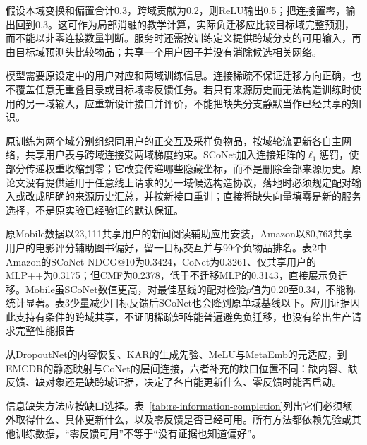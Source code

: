 假设本域变换和偏置合计0.3，跨域贡献为0.2，则ReLU输出0.5；把连接置零，输出回到0.3。这可作为局部消融的教学计算，实际负迁移应比较目标域完整预测，而不能以非零连接数量判断。服务时还需按训练定义提供跨域分支的可用输入，再由目标域预测头比较物品；共享一个用户因子并没有消除候选相关网络。

模型需要原设定中的用户对应和两域训练信息。连接稀疏不保证迁移方向正确，也不覆盖任意无重叠目录或目标域零反馈任务。若只有来源历史而无法构造训练时使用的另一域输入，应重新设计接口并评价，不能把缺失分支静默当作已经共享的知识。

原训练为两个域分别组织同用户的正交互及采样负物品，按域轮流更新各自主网络，共享用户表与跨域连接受两域梯度约束。SCoNet加入连接矩阵的$\ell_1$惩罚，使部分传递权重收缩到零；它改变传递哪些隐藏坐标，而不是删除全部来源历史。原论文没有提供适用于任意线上请求的另一域候选构造协议，落地时必须规定配对输入或改成明确的来源历史汇总，并按新接口重训；直接将缺失向量填零是新的服务选择，不是原实验已经验证的默认保证。

原Mobile数据以23,111共享用户的新闻阅读辅助应用安装，Amazon以80,763共享用户的电影评分辅助图书偏好，留一目标交互并与99个负物品排名。表2中Amazon的SCoNet NDCG@10为0.3424，CoNet为0.3261、仅共享用户的MLP++为0.3175；但CMF为0.2378，低于不迁移MLP的0.3143，直接展示负迁移。Mobile虽SCoNet数值更高，对最佳基线的配对检验$p$值为0.20至0.34，不能称统计显著。表3少量减少目标反馈后SCoNet也会降到原单域基线以下。应用证据因此支持有条件的跨域共享，不证明稀疏矩阵能普遍避免负迁移，也没有给出生产请求完整性能报告

从DropoutNet的内容恢复、KAR的生成先验、MeLU与MetaEmb的元适应，到EMCDR的静态映射与CoNet的层间连接，六者补充的缺口位置不同：缺内容、缺反馈、缺对象还是缺跨域证据，决定了各自能更新什么、零反馈时能否启动。

信息缺失方法应按缺口选择。表~\ref{tab:rs-information-completion}列出它们必须额外取得什么、具体更新什么，以及零反馈是否已经可用。所有方法都依赖先验或其他训练数据，“零反馈可用”不等于“没有证据也知道偏好”。

